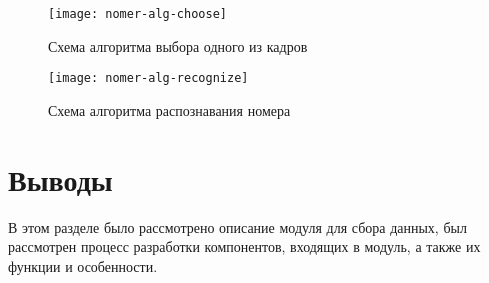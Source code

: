 \newpage

\begin{figure}[h!]
	\centering
	\texttt{[image: nomer-alg-choose]}
	\caption{Схема алгоритма выбора одного из кадров}
	\label{f:nomer-alg-choose}
\end{figure}

\begin{figure}[h!]
	\centering
	\texttt{[image: nomer-alg-recognize]}
	\caption{Схема алгоритма распознавания номера}
	\label{f:nomer-alg-recognize}
\end{figure}

\newpage
\section*{Выводы}

В этом разделе было рассмотрено описание модуля для сбора данных, был рассмотрен процесс разработки компонентов, входящих в модуль, а также их функции и особенности.